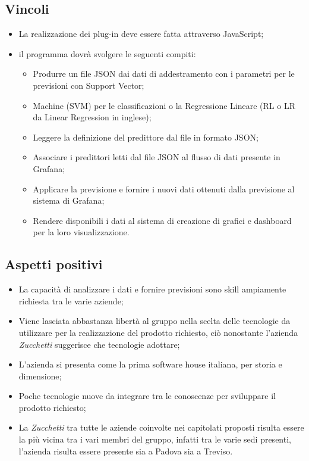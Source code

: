 \subsection{Vincoli}
\begin{itemize}
\item La realizzazione dei plug-in deve essere fatta attraverso JavaScript;
\item il programma dovrà svolgere le seguenti compiti:
\begin{itemize}
\item Produrre un file JSON dai dati di addestramento con i parametri per le previsioni con Support Vector;
\item Machine (SVM) per le classificazioni o la Regressione Lineare (RL o LR da Linear Regression in inglese);
\item Leggere la definizione del predittore dal file in formato JSON;
\item Associare i predittori letti dal file JSON al flusso di dati presente in Grafana;
\item Applicare la previsione e fornire i nuovi dati ottenuti dalla previsione al sistema di Grafana;
\item Rendere disponibili i dati al sistema di creazione di grafici e dashboard per la loro visualizzazione.
\end{itemize}
\end{itemize}

\subsection{Aspetti positivi}
\begin{itemize}
\item La capacità di analizzare i dati e fornire previsioni sono skill ampiamente richiesta tra le varie aziende;
\item Viene lasciata abbastanza libertà al gruppo nella scelta delle tecnologie da utilizzare per la realizzazione del prodotto richiesto, ciò nonostante l'azienda \textit{Zucchetti} suggerisce che tecnologie adottare;
\item L'azienda si presenta come la prima software house italiana, per storia e dimensione;
\item Poche tecnologie nuove da integrare tra le conoscenze per sviluppare il prodotto richiesto;
\item La \textit{Zucchetti} tra tutte le aziende coinvolte nei capitolati proposti risulta essere la più vicina tra i vari membri del gruppo, infatti tra le varie sedi presenti, l'azienda risulta essere presente sia a Padova sia a Treviso.

\end{itemize}


